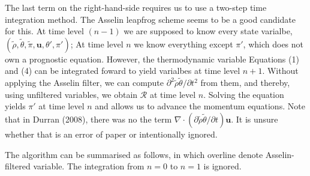 \documentclass[a4paper,11pt]{article}
\begin{document}
The last term on the right-hand-side requires us to use a two-step time integration method. The Asselin leapfrog scheme seems to be a good candidate for this. At time level $(n-1)$ we are supposed to know every state varialbe, $(\tilde{\rho},\tilde{\theta},\tilde{\pi},\mathbf{u},\theta',\pi')$; At time level $n$ we know everything except $\pi'$, which does not own a prognostic equation. However, the thermodynamic variable Equations (1) and (4) can be integrated foward to yield varialbes at time level $n+1$. Without applying the Asselin filter, we can compute $\partial^2\tilde{\rho}\tilde{\theta}/\partial t^2$ from them, and thereby, using unfiltered variables, we obtain $\mathcal{R}$ at time level $n$. Solving the equation yields $\pi'$ at time level $n$ and allows us to advance the momentum equations. Note that in Durran (2008), there was no the term $\nabla\cdot(\partial\tilde{\rho}\tilde{\theta}/\partial t)\mathbf{u}$. It is unsure whether that is an error of paper or intentionally ignored. 


The algorithm can be summarised as follows, in which overline denote Asselin-filtered variable. The integration from $n=0$ to $n=1$ is ignored.
\end{document}
